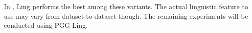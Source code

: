 In , Ling performs the best among these variants.
The actual linguistic feature to use may vary from dataset to dataset though.
The remaining experiments will be conducted using PGG-Ling.
%

